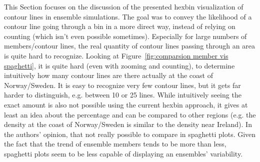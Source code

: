 This Section focuses on the discussion of the presented hexbin visualization of contour lines in ensemble simulations. 
The goal was to convey the likelihood of a contour line going through a bin in a more direct way, instead of relying on counting (which isn't even possible sometimes). 
Especially for large numbers of members/contour lines, the real quantity of contour lines passing through an area is quite hard to recognize. 
Looking at Figure~\ref{fig:comparsion member vis spaghetti}, it is quite hard (even with zooming and counting), to determine intuitively how many contour lines are there actually at the coast of Norway/Sweden. 
It is easy to recognize very few contour lines, but it gets far harder to distinguish, e.g. between 10 or 25 lines. 
While intuitively seeing the exact amount is also not possible using the current hexbin approach, it gives at least an idea about the percentage and can be compared to other regions (e.g. the density at the coast of Norway/Sweden is similar to the density near Ireland). 
In the authors' opinion, that not really possible to compare in spaghetti plots. 
Given the fact that the trend of ensemble members tends to be more than less, spaghetti plots seem to be less capable of displaying an ensembles' variability. 


